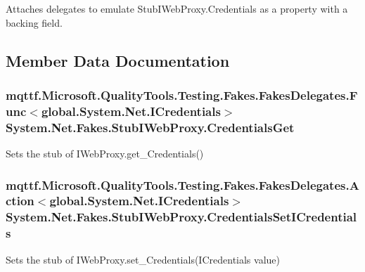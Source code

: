 Attaches delegates to emulate Stub\-I\-Web\-Proxy.\-Credentials as a property with a backing field.



\subsection{Member Data Documentation}
\hypertarget{class_system_1_1_net_1_1_fakes_1_1_stub_i_web_proxy_a46aa1c5231317c5fba149974427842fa}{
\subsubsection[{Credentials\-Get}]{\setlength{\rightskip}{0pt plus 5cm}mqttf.\-Microsoft.\-Quality\-Tools.\-Testing.\-Fakes.\-Fakes\-Delegates.\-Func$<$global.\-System.\-Net.\-I\-Credentials$>$ System.\-Net.\-Fakes.\-Stub\-I\-Web\-Proxy.\-Credentials\-Get}}\label{class_system_1_1_net_1_1_fakes_1_1_stub_i_web_proxy_a46aa1c5231317c5fba149974427842fa}


Sets the stub of I\-Web\-Proxy.\-get\-\_\-\-Credentials()

\hypertarget{class_system_1_1_net_1_1_fakes_1_1_stub_i_web_proxy_a160403ddf45655183b4b5dc099711d73}{
\subsubsection[{Credentials\-Set\-I\-Credentials}]{\setlength{\rightskip}{0pt plus 5cm}mqttf.\-Microsoft.\-Quality\-Tools.\-Testing.\-Fakes.\-Fakes\-Delegates.\-Action$<$global.\-System.\-Net.\-I\-Credentials$>$ System.\-Net.\-Fakes.\-Stub\-I\-Web\-Proxy.\-Credentials\-Set\-I\-Credentials}}\label{class_system_1_1_net_1_1_fakes_1_1_stub_i_web_proxy_a160403ddf45655183b4b5dc099711d73}


Sets the stub of I\-Web\-Proxy.\-set\-\_\-\-Credentials(\-I\-Credentials value)

